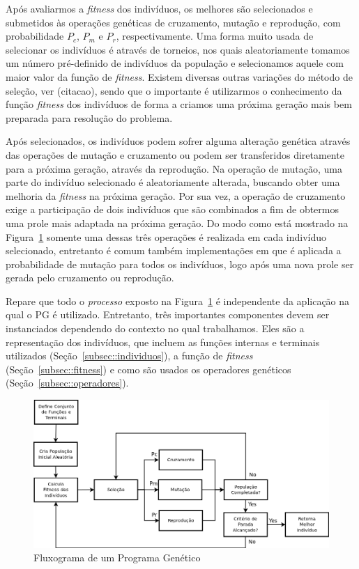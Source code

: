 Após avaliarmos a \textit{fitness} dos indivíduos, os melhores são selecionados e submetidos às operações genéticas de cruzamento, mutação e reprodução, com probabilidade $P_c$, $P_m$ e $P_r$, respectivamente.
Uma forma muito usada de selecionar os indivíduos é através de torneios, nos quais aleatoriamente tomamos um número pré-definido de indivíduos da população e selecionamos aquele com maior valor da função de \textit{fitness}. Existem diversas outras variações do método de seleção, ver (citacao), sendo que o importante é utilizarmos o conhecimento da função \textit{fitness} dos indivíduos de forma a criamos uma próxima geração mais bem preparada para resolução do problema. 

Após selecionados, os indivíduos podem sofrer alguma alteração genética através das operações de mutação e cruzamento ou podem ser transferidos diretamente para a próxima geração, através da reprodução. 
Na operação de mutação, uma parte do indivíduo selecionado é aleatoriamente alterada, buscando obter uma melhoria da \textit{fitness} na próxima geração.
Por sua vez, a operação de cruzamento exige a participação de dois indivíduos que são combinados a fim de obtermos uma prole mais adaptada na próxima geração.
Do modo como está mostrado na Figura~\ref{fig::gpwf} somente uma dessas três operações é realizada em cada indivíduo selecionado, entretanto é comum também implementações em que é aplicada a probabilidade de mutação para todos os indivíduos, logo após uma nova prole ser gerada pelo cruzamento ou reprodução.

Repare que todo o \textit{processo} exposto na Figura~\ref{fig::gpwf} é independente da aplicação na qual o \textsc{PG} é utilizado. 
Entretanto, três importantes componentes devem ser instanciados dependendo do contexto no qual trabalhamos. 
Eles são a representação dos indivíduos, que incluem as funções internas e terminais utilizados (Seção~\ref{subsec::individuos}), a função de \textit{fitness} (Seção~\ref{subsec::fitness}) e como são usados os operadores genéticos (Seção~\ref{subsec::operadores}).

\begin{figure}[ht!]
\centering
\includegraphics[width=1.0\textwidth]{figures/gpwf.png}
\caption{Fluxograma de um Programa Genético}
\label{fig::gpwf}
\end{figure}


